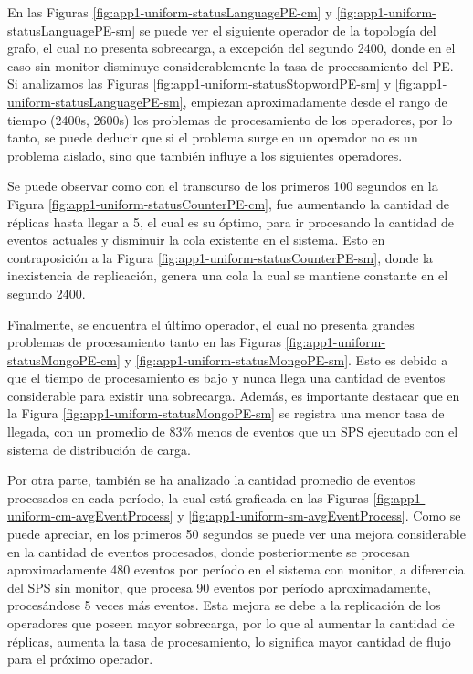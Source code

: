 En las Figuras \ref{fig:app1-uniform-statusLanguagePE-cm} y \ref{fig:app1-uniform-statusLanguagePE-sm} se puede ver el siguiente operador de la topología del grafo, el cual no presenta sobrecarga, a excepción del segundo 2400, donde en el caso sin monitor disminuye considerablemente la tasa de procesamiento del PE. Si analizamos las Figuras \ref{fig:app1-uniform-statusStopwordPE-sm} y \ref{fig:app1-uniform-statusLanguagePE-sm}, empiezan aproximadamente desde el rango de tiempo (2400s, 2600s) los problemas de procesamiento de los operadores, por lo tanto, se puede deducir que si el problema surge en un operador no es un problema aislado, sino que también influye a los siguientes operadores.

Se puede observar como con el transcurso de los primeros 100 segundos en la Figura \ref{fig:app1-uniform-statusCounterPE-cm}, fue aumentando la cantidad de réplicas hasta llegar a 5, el cual es su óptimo, para ir procesando la cantidad de eventos actuales y disminuir la cola existente en el sistema. Esto en contraposición a la Figura \ref{fig:app1-uniform-statusCounterPE-sm}, donde la inexistencia de replicación, genera una cola la cual se mantiene constante en el segundo 2400.

Finalmente, se encuentra el último operador, el cual no presenta grandes problemas de procesamiento tanto en las Figuras \ref{fig:app1-uniform-statusMongoPE-cm} y \ref{fig:app1-uniform-statusMongoPE-sm}. Esto es debido a que el tiempo de procesamiento es bajo y nunca llega una cantidad de eventos considerable para existir una sobrecarga. Además, es importante destacar que en la Figura \ref{fig:app1-uniform-statusMongoPE-sm} se registra una menor tasa de llegada, con un promedio de $83\%$ menos de eventos que un SPS ejecutado con el sistema de distribución de carga.

Por otra parte, también se ha analizado la cantidad promedio de eventos procesados en cada período, la cual está graficada en las Figuras \ref{fig:app1-uniform-cm-avgEventProcess} y \ref{fig:app1-uniform-sm-avgEventProcess}. Como se puede apreciar, en los primeros 50 segundos se puede ver una mejora considerable en la cantidad de eventos procesados, donde posteriormente se procesan aproximadamente 480 eventos por período en el sistema con monitor, a diferencia del SPS sin monitor, que procesa 90 eventos por período aproximadamente, procesándose 5 veces más eventos. Esta mejora se debe a la replicación de los operadores que poseen mayor sobrecarga, por lo que al aumentar la cantidad de réplicas, aumenta la tasa de procesamiento, lo significa mayor cantidad de flujo para el próximo operador.

